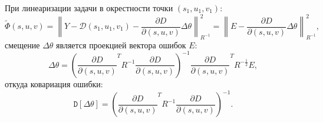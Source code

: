 \documentclass[a4paper,12pt]{article}
\newcommand{\norm}[2]{\left \| #1 \right \|_{#2}}
\newcommand{\variance}[1]{\mathtt{D} \left[ #1 \right]}
\newcommand{\jacobi}[2]{\frac{\partial #1}{\partial \left( #2 \right)}}
\begin{document}
    При линеаризации задачи в окрестности точки $(s_1, u_1, v_1)$:
    \[
        \widetilde{\Phi}(s,u,v)
        = \norm{Y - \mathcal{D}(s_1,u_1,v_1) - \jacobi{D}{s,u,v} \Delta \theta}{R^{-1}}^2
        = \norm{E - \jacobi{D}{s,u,v} \Delta \theta}{R^{-1}}^2 ,
    \]
    смещение $\Delta \theta$ является проекцией вектора ошибок $E$:
    \[
        \Delta \theta = \left( \jacobi{D}{s,u,v}^T R^{-1}\jacobi{D}{s,u,v} \right)^{-1} \jacobi{D}{s,u,v}^T R^{-\frac{1}{2}} E ,
    \]
    откуда ковариация ошибки:
    \[
        \variance{\Delta \theta} = \left( \jacobi{D}{s,u,v}^T R^{-1}\jacobi{D}{s,u,v} \right)^{-1} .
    \]
\end{document}
